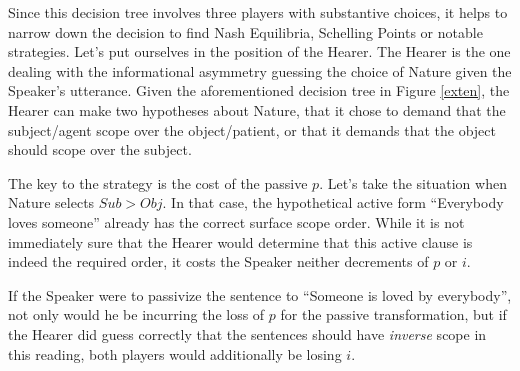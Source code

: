 \documentclass{article}
\begin{document}
Since this decision tree involves three players with substantive choices, it helps to narrow down the decision to find Nash Equilibria, Schelling Points or notable strategies.
Let's put ourselves in the position of the Hearer.
The Hearer is the one dealing with the informational asymmetry guessing the choice of Nature given the Speaker's utterance.
Given the aforementioned decision tree in Figure \ref{exten}, the Hearer can make two hypotheses about Nature, that it chose to demand that the subject/agent scope over the object/patient, or that it demands that the object should scope over the subject.

The key to the strategy is the cost of the passive $p$.
Let's take the situation when Nature selects $Sub>Obj$.
In that case, the hypothetical active form ``Everybody loves someone'' already has the correct surface scope order.
While it is not immediately sure that the Hearer would determine that this active clause is indeed the required order, it costs the Speaker neither decrements of $p$ or $i$.

If the Speaker were to passivize the sentence to ``Someone is loved by everybody'', not only would he be incurring the loss of $p$ for the passive transformation, but if the Hearer did guess correctly that the sentences should have \emph{inverse} scope in this reading, both players would additionally be losing $i$.
\end{document}
